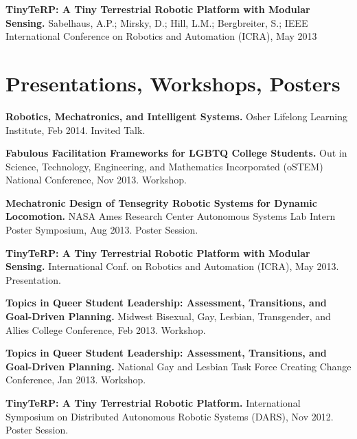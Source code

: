 \documentclass[letterpaper]{deedy-resume} %
\begin{document}
\begin{minipage}[t]{0.66\textwidth}
\begin{tightitemize}
\item \textbf{TinyTeRP: A Tiny Terrestrial Robotic Platform with Modular Sensing.} Sabelhaus, A.P.; Mirsky, D.; Hill, L.M.; Bergbreiter, S.; IEEE International Conference on Robotics and Automation (ICRA), May 2013 

\end{tightitemize}

\sectionspace


\section{Presentations, Workshops, Posters}

\vspace{0.4cm}
\begin{tightitemize}

\item \textbf{Robotics, Mechatronics, and Intelligent Systems.} Osher Lifelong Learning Institute, Feb 2014. Invited Talk.

\item \textbf{Fabulous Facilitation Frameworks for LGBTQ College Students.} Out in Science, Technology, Engineering, and Mathematics Incorporated (oSTEM) National Conference, Nov 2013. Workshop.

\item \textbf{Mechatronic Design of Tensegrity Robotic Systems for Dynamic Locomotion.} NASA Ames Research Center Autonomous Systems Lab Intern Poster Symposium, Aug 2013. Poster Session.

\item \textbf{TinyTeRP: A Tiny Terrestrial Robotic Platform with Modular Sensing.} International Conf. on Robotics and Automation (ICRA), May 2013. Presentation.

\item \textbf{Topics in Queer Student Leadership: Assessment, Transitions, and Goal-Driven Planning.} Midwest Bisexual, Gay, Lesbian, Transgender, and Allies College Conference, Feb 2013. Workshop.

\item \textbf{Topics in Queer Student Leadership: Assessment, Transitions, and Goal-Driven Planning.} National Gay and Lesbian Task Force Creating Change Conference, Jan 2013. Workshop.

\item \textbf{TinyTeRP: A Tiny Terrestrial Robotic Platform.} International Symposium on Distributed Autonomous Robotic Systems (DARS), Nov 2012. Poster Session.

\end{tightitemize}


\end{minipage}%
\end{document}
